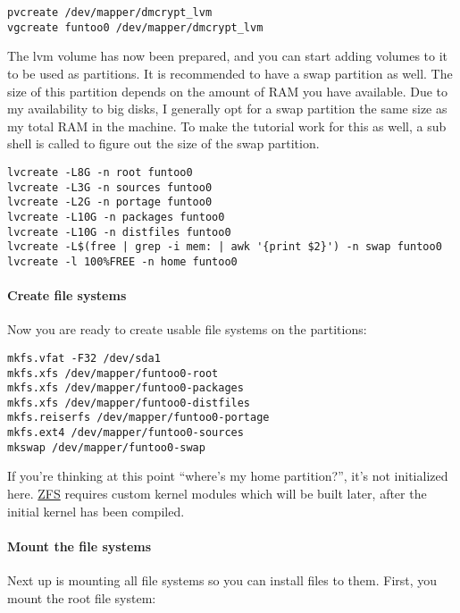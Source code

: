 \begin{verbatim}
pvcreate /dev/mapper/dmcrypt_lvm
vgcreate funtoo0 /dev/mapper/dmcrypt_lvm
\end{verbatim}

The lvm volume has now been prepared, and you can start adding volumes
to it to be used as partitions. It is recommended to have a swap
partition as well. The size of this partition depends on the amount of
RAM you have available. Due to my availability to big disks, I generally
opt for a swap partition the same size as my total RAM in the machine.
To make the tutorial work for this as well, a sub shell is called to
figure out the size of the swap partition.

\begin{verbatim}
lvcreate -L8G -n root funtoo0
lvcreate -L3G -n sources funtoo0
lvcreate -L2G -n portage funtoo0
lvcreate -L10G -n packages funtoo0
lvcreate -L10G -n distfiles funtoo0
lvcreate -L$(free | grep -i mem: | awk '{print $2}') -n swap funtoo0
lvcreate -l 100%FREE -n home funtoo0
\end{verbatim}

\paragraph{Create file systems}\label{create-file-systems}

Now you are ready to create usable file systems on the partitions:

\begin{verbatim}
mkfs.vfat -F32 /dev/sda1
mkfs.xfs /dev/mapper/funtoo0-root
mkfs.xfs /dev/mapper/funtoo0-packages
mkfs.xfs /dev/mapper/funtoo0-distfiles
mkfs.reiserfs /dev/mapper/funtoo0-portage
mkfs.ext4 /dev/mapper/funtoo0-sources
mkswap /dev/mapper/funtoo0-swap
\end{verbatim}

If you're thinking at this point ``where's my home partition?'', it's
not initialized here. \href{https://en.wikipedia.org/wiki/ZFS}{ZFS}
requires custom kernel modules which will be built later, after the
initial kernel has been compiled.

\paragraph{Mount the file systems}\label{mount-the-file-systems}

Next up is mounting all file systems so you can install files to them.
First, you mount the root file system:

